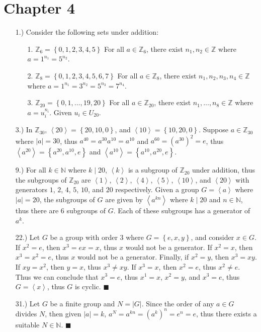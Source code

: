 \documentclass[12pt]{article}
\newcommand{\angleb}[1]{\left\langle#1\right\rangle} %
\newcommand{\vertb}[1]{\left\vert#1\right\vert}      %
\newcommand{\braces}[1]{\left\{#1\right\}}           %
\newcommand{\parens}[1]{\left(#1\right)}             %
\newcommand{\N}{\mathbb{N}}
\newcommand{\Z}{\mathbb{Z}}
\begin{document}
\pagestyle{fancy}
\fancyhead{}

\normalsize

\section*{Chapter 4}
\begin{itemize}
    \item [1.)] Consider the following sets under addition:
    \begin{itemize}
        \item [1.] $\Z_6=\braces{0,1,2,3,4,5}$\newline
        For all $a\in\Z_6$, there exist $n_1,n_2\in\Z$ where $a=1^{n_1}=5^{n_2}$.

        \item [2.] $\Z_8=\braces{0,1,2,3,4,5,6,7}$\newline
        For all $a\in\Z_8$, there exist $n_1,n_2,n_3,n_4\in\Z$ where $a=1^{n_1}=3^{n_2}=5^{n_3}=7^{n_4}$.

        \item [3.] $\Z_{20}=\braces{0,1,\dots,19,20}$\newline
        For all $a\in\Z_{20}$, there exist $n_1,\dots,n_8\in\Z$ where $a=u_i^{n_i}$. Given $u_i\in U_{20}$.
    \end{itemize}

    \item [3.)] In $\Z_{30}$, $\angleb{20}=\braces{20,10,0}$, and $\angleb{10}=\braces{10,20,0}$. Suppose $a\in\Z_{30}$ where $\vertb{a}=30$, thus $a^{40}=a^{30}a^{10}=a^{10}$ and $a^{60}=\parens{a^{30}}^2=e$, thus $\angleb{a^{20}}=\braces{a^{20},a^{10},e}$ and $\angleb{a^{10}}=\braces{a^{10},a^{20},e}$.

    \item [9.)] For all $k\in\N$ where $k\mid20$, $\angleb{k}$ is a subgroup of $\Z_{20}$ under addition, thus the subgroups of $\Z_{20}$ are $\angleb{1}$, $\angleb{2}$, $\angleb{4}$, $\angleb{5}$, $\angleb{10}$, and $\angleb{20}$ with generators $1$, $2$, $4$, $5$, $10$, and $20$ respectively. Given a group $G=\angleb{a}$ where $\vertb{a}=20$, the subgroups of $G$ are given by $\angleb{a^{kn}}$ where $k\mid20$ and $n\in\N$, thus there are $6$ subgroups of $G$. Each of these subgroups has a generator of $a^k$.

    \item [22.)] Let $G$ be a group with order $3$ where $G=\braces{e,x,y}$, and consider $x\in G$. If $x^2=e$, then $x^3=ex=x$, thus $x$ would not be a generator. If $x^2=x$, then $x^3=x^2=e$, thus $x$ would not be a generator. Finally, if $x^2=y$, then $x^3=xy$. If $xy=x^2$, then $y=x$, thus $x^3\ne xy$. If $x^3=x$, then $x^2=e$, thus $x^2\ne e$. Thus we can conclude that $x^3=e$, thus $x^1=x$, $x^2=y$, and $x^3=e$, thus $G=\angleb{x}$, thus $G$ is cyclic. $\blacksquare$

    \item [31.)] Let $G$ be a finite group and $N=\vertb{G}$. Since the order of any $a\in G$ divides $N$, then given $\vertb{a}=k$, $a^N=a^{kn}=\parens{a^k}^n=e^n=e$, thus there exists a suitable $N\in\N$. $\blacksquare$
\end{itemize}
\end{document}
